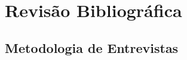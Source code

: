 \chapter[Revisão Bibliográfica]{Revisão Bibliográfica}
\label{chap:revisao}
\section{Metodologia de Entrevistas}
\label{cha:ensino}

